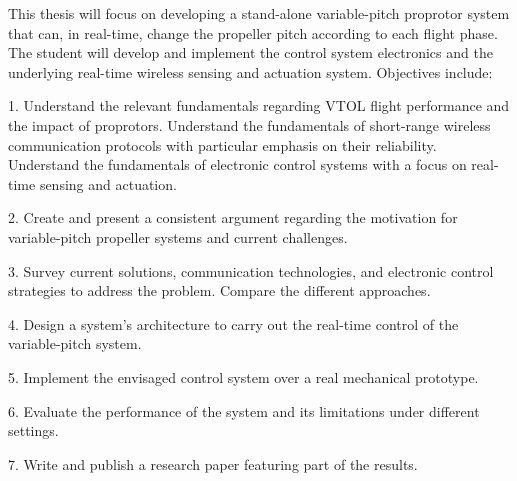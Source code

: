 This thesis will focus on developing a stand-alone variable-pitch proprotor system that can, in real-time, change the propeller pitch according to each flight phase. The student will develop and implement the control system electronics and the underlying real-time wireless sensing and actuation system. Objectives include:



1. Understand the relevant fundamentals regarding VTOL flight performance and the impact of proprotors. Understand the fundamentals of short-range wireless communication protocols with particular emphasis on their reliability. Understand the fundamentals of electronic control systems with a focus on real-time sensing and actuation.

2. Create and present a consistent argument regarding the motivation for variable-pitch propeller systems and current challenges.

3. Survey current solutions, communication technologies, and electronic control strategies to address the problem. Compare the different approaches.

4. Design a system’s architecture to carry out the real-time control of the variable-pitch system.

5. Implement the envisaged control system over a real mechanical prototype.

6. Evaluate the performance of the system and its limitations under different settings.

7. Write and publish a research paper featuring part of the results.